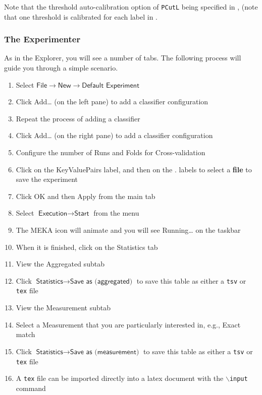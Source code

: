 \documentclass[11pt]{article}
\begin{document}
Note that the threshold auto-calibration option of \texttt{PCutL} being specified in , (note that one threshold is calibrated for each label in . 

\subsubsection{The Experimenter}

As in the Explorer, you will see a number of tabs. The following process will guide you through a simple scenario.
\begin{enumerate}
	\item Select $\textsf{File}\rightarrow\textsf{New}\rightarrow\textsf{Default Experiment}$
	\item Click \textsf{Add\ldots} (on the left pane) to add a classifier configuration
	\item Repeat the process of adding a classifier
	\item Click \textsf{Add\ldots} (on the right pane) to add a classifier configuration
	\item Configure the number of \textsf{Runs} and \textsf{Folds} for \textsf{Cross-validation}
	\item Click on the \textsf{KeyValuePairs} label, and then on the \textsf{.} labels to select a \textbf{file} to save the experiment
	\item Click \textsf{OK} and then \textsf{Apply} from the main tab
	\item Select $\textsf{Execution}\rightarrow\textsf{Start}$ from the menu
	\item The MEKA icon will animate and you will see \textsf{Running\ldots} on the taskbar
	\item When it is finished, click on the \textsf{Statistics} tab
	\item View the \textsf{Aggregated} subtab
	\item Click $\textsf{Statistics}\rightarrow\textsf{Save as (aggregated)}$ to save this table as either a \texttt{tsv} or \texttt{tex} file
	\item View the \textsf{Measurement} subtab
	\item Select a \textsf{Measurement} that you are particularly interested in, e.g., \textsf{Exact match}
	\item Click $\textsf{Statistics}\rightarrow\textsf{Save as (measurement)}$ to save this table as either a \texttt{tsv} or \texttt{tex} file
	\item A \texttt{tex} file can be imported directly into a latex document with the \texttt{$\backslash$input} command
\end{enumerate}
\end{document}
